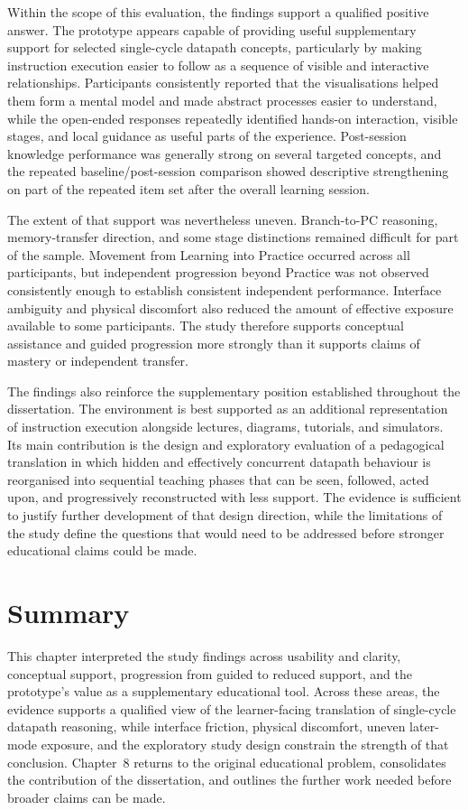 Within the scope of this evaluation, the findings support a qualified positive answer. The prototype appears capable of providing useful supplementary support for selected single-cycle datapath concepts, particularly by making instruction execution easier to follow as a sequence of visible and interactive relationships. Participants consistently reported that the visualisations helped them form a mental model and made abstract processes easier to understand, while the open-ended responses repeatedly identified hands-on interaction, visible stages, and local guidance as useful parts of the experience. Post-session knowledge performance was generally strong on several targeted concepts, and the repeated baseline/post-session comparison showed descriptive strengthening on part of the repeated item set after the overall learning session.

The extent of that support was nevertheless uneven. Branch-to-PC reasoning, memory-transfer direction, and some stage distinctions remained difficult for part of the sample. Movement from Learning into Practice occurred across all participants, but independent progression beyond Practice was not observed consistently enough to establish consistent independent performance. Interface ambiguity and physical discomfort also reduced the amount of effective exposure available to some participants. The study therefore supports conceptual assistance and guided progression more strongly than it supports claims of mastery or independent transfer.

The findings also reinforce the supplementary position established throughout the dissertation. The environment is best supported as an additional representation of instruction execution alongside lectures, diagrams, tutorials, and simulators. Its main contribution is the design and exploratory evaluation of a pedagogical translation in which hidden and effectively concurrent datapath behaviour is reorganised into sequential teaching phases that can be seen, followed, acted upon, and progressively reconstructed with less support. The evidence is sufficient to justify further development of that design direction, while the limitations of the study define the questions that would need to be addressed before stronger educational claims could be made.

\section{Summary}

This chapter interpreted the study findings across usability and clarity, conceptual support, progression from guided to reduced support, and the prototype's value as a supplementary educational tool. Across these areas, the evidence supports a qualified view of the learner-facing translation of single-cycle datapath reasoning, while interface friction, physical discomfort, uneven later-mode exposure, and the exploratory study design constrain the strength of that conclusion. Chapter~8 returns to the original educational problem, consolidates the contribution of the dissertation, and outlines the further work needed before broader claims can be made.
